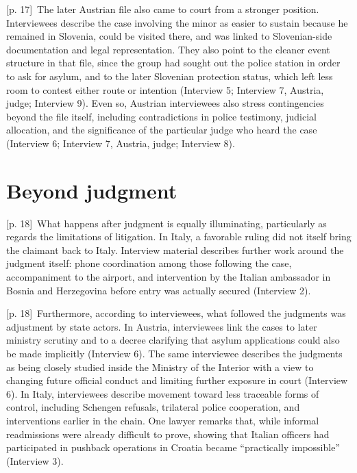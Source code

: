 \documentclass[10pt,a4paper]{article}
\begin{document}
{\scriptsize\color{gray} [p. 17]}\ The later Austrian file also came to court from a stronger position. Interviewees describe the case involving the minor as easier to sustain because he remained in Slovenia, could be visited there, and was linked to Slovenian-side documentation and legal representation. They also point to the cleaner event structure in that file, since the group had sought out the police station in order to ask for asylum, and to the later Slovenian protection status, which left less room to contest either route or intention (Interview 5; Interview 7, Austria, judge; Interview 9). Even so, Austrian interviewees also stress contingencies beyond the file itself, including contradictions in police testimony, judicial allocation, and the significance of the particular judge who heard the case (Interview 6; Interview 7, Austria, judge; Interview 8).\par
{}\section*{Beyond judgment}
{\scriptsize\color{gray} [p. 18]}\ What happens after judgment is equally illuminating, particularly as regards the limitations of litigation. In Italy, a favorable ruling did not itself bring the claimant back to Italy. Interview material describes further work around the judgment itself: phone coordination among those following the case, accompaniment to the airport, and intervention by the Italian ambassador in Bosnia and Herzegovina before entry was actually secured (Interview 2).\par
{\scriptsize\color{gray} [p. 18]}\ Furthermore, according to interviewees, what followed the judgments was adjustment by state actors. In Austria, interviewees link the cases to later ministry scrutiny and to a decree clarifying that asylum applications could also be made implicitly (Interview 6). The same interviewee describes the judgments as being closely studied inside the Ministry of the Interior with a view to changing future official conduct and limiting further exposure in court (Interview 6). In Italy, interviewees describe movement toward less traceable forms of control, including Schengen refusals, trilateral police cooperation, and interventions earlier in the chain. One lawyer remarks that, while informal readmissions were already difficult to prove, showing that Italian officers had participated in pushback operations in Croatia became “practically impossible” (Interview 3).\par
\end{document}
